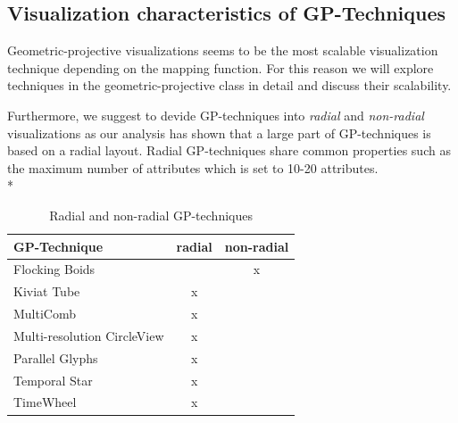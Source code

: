 \subsection{Visualization characteristics of GP-Techniques}
Geometric-projective visualizations seems to be the most scalable visualization technique depending on the mapping function. For this reason we will explore techniques in the geometric-projective class in detail and discuss their scalability.


Furthermore, we suggest to devide GP-techniques into \textit{radial} and \textit{non-radial} visualizations\cite{Diehl2010} as our  analysis has shown that a large part of GP-techniques is based on a radial layout. Radial GP-techniques share common properties such as the maximum number of attributes which is set to 10-20 attributes\cite{Diehl2010}.\\*


\begin{table}[H]
	\centering
	\caption[Table 1]{Radial and non-radial GP-techniques}
	\label{radialTable}
	\begin{tabu}{lcc}
	\toprule
	GP-Technique & radial & non-radial \\
	\midrule
	Flocking Boids &  & x \\
	Kiviat Tube & x &  \\
	MultiComb & x &  \\
	Multi-resolution CircleView & x &  \\
	Parallel Glyphs & x &  \\
    Temporal Star & x &  \\
	TimeWheel & x & \\
	\bottomrule
	\end{tabu}
\end{table}

